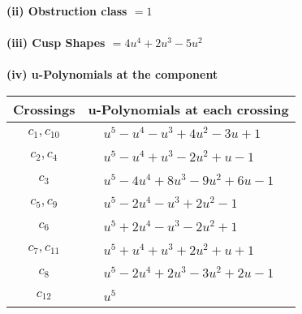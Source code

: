 \documentclass[1p]{elsarticle_modified}
\theoremstyle{definition}
\begin{document}
\flushleft \textbf{(ii) Obstruction class $= 1$}\\~\\
\flushleft \textbf{(iii) Cusp Shapes $= 4 u^4+2 u^3-5 u^2$}\\~\\
\newpage\renewcommand{\arraystretch}{1}
\flushleft \textbf{(iv) u-Polynomials at the component}\newline \\
\begin{tabular}{m{50pt}|m{274pt}}
Crossings & \hspace{64pt}u-Polynomials at each crossing \\
\hline $$\begin{aligned}c_{1},c_{10}\end{aligned}$$&$\begin{aligned}
&u^5- u^4- u^3+4 u^2-3 u+1
\end{aligned}$\\
\hline $$\begin{aligned}c_{2},c_{4}\end{aligned}$$&$\begin{aligned}
&u^5- u^4+u^3-2 u^2+u-1
\end{aligned}$\\
\hline $$\begin{aligned}c_{3}\end{aligned}$$&$\begin{aligned}
&u^5-4 u^4+8 u^3-9 u^2+6 u-1
\end{aligned}$\\
\hline $$\begin{aligned}c_{5},c_{9}\end{aligned}$$&$\begin{aligned}
&u^5-2 u^4- u^3+2 u^2-1
\end{aligned}$\\
\hline $$\begin{aligned}c_{6}\end{aligned}$$&$\begin{aligned}
&u^5+2 u^4- u^3-2 u^2+1
\end{aligned}$\\
\hline $$\begin{aligned}c_{7},c_{11}\end{aligned}$$&$\begin{aligned}
&u^5+u^4+u^3+2 u^2+u+1
\end{aligned}$\\
\hline $$\begin{aligned}c_{8}\end{aligned}$$&$\begin{aligned}
&u^5-2 u^4+2 u^3-3 u^2+2 u-1
\end{aligned}$\\
\hline $$\begin{aligned}c_{12}\end{aligned}$$&$\begin{aligned}
&u^5
\end{aligned}$\\
\hline
\end{tabular}\\~\\
\end{document}
